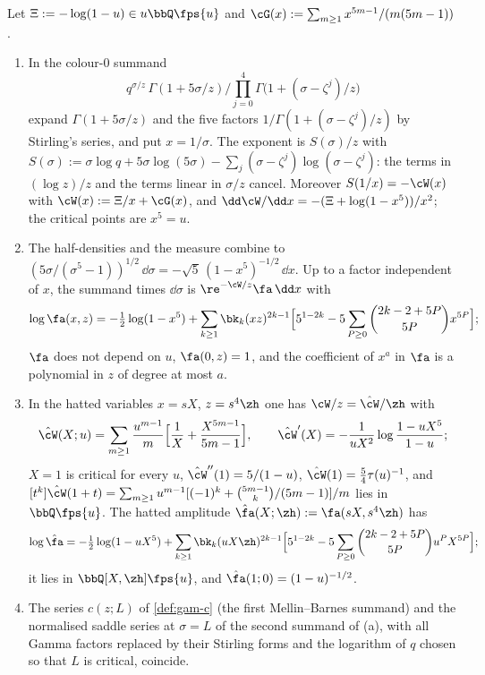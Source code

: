 \begin{lem}
\label{lem:con-form}
Let $\Xi:=-\log(1-u)\in u\bbQ\fps{u}$ and $\cG(x):=\sum_{m\geq1}x^{5m-1}/(m(5m-1))$.
\begin{enumerate}
\item[(a)] In the colour-$0$ summand
\[
q^{\sigma/z}\,\Gamma(1+5\sigma/z)\Big/\prod_{j=0}^4\Gamma\bigl(1+(\sigma-\zeta^j)/z\bigr)
\]
expand $\Gamma(1+5\sigma/z)$ and the five factors $1/\Gamma(1+(\sigma-\zeta^j)/z)$ by Stirling's series, and put $x=1/\sigma$. The exponent is $S(\sigma)/z$ with $S(\sigma):=\sigma\log q+5\sigma\log(5\sigma)-\sum_j(\sigma-\zeta^j)\log(\sigma-\zeta^j)$: the terms in $(\log z)/z$ and the terms linear in $\sigma/z$ cancel. Moreover $S(1/x)=-\cW(x)$ with $\cW(x):=\Xi/x+\cG(x)$, and $\dd\cW/\dd x=-(\Xi+\log(1-x^5))/x^2$; the critical points are $x^5=u$.
\item[(b)] The half-densities and the measure combine to $(5\sigma/(\sigma^5-1))^{1/2}\,\dd\sigma=-\sqrt5\,(1-x^5)^{-1/2}\,\dd x$. Up to a factor independent of $x$, the summand times $\dd\sigma$ is $\re^{-\cW/z}\fa\,\dd x$ with
\[
\log\fa(x,z)=-\tfrac12\log(1-x^5)+\sum_{k\geq1}\bk_k(xz)^{2k-1}\Bigl[5^{1-2k}-5\sum_{P\geq0}\binom{2k-2+5P}{5P}x^{5P}\Bigr];
\]
$\fa$ does not depend on $u$, $\fa(0,z)=1$, and the coefficient of $x^a$ in $\fa$ is a polynomial in $z$ of degree at most $a$.
\item[(c)] In the hatted variables $x=sX$, $z=s^4\zh$ one has $\cW/z=\hat\cW/\zh$ with
\[
\hat\cW(X;u)=\sum_{m\geq1}\frac{u^{m-1}}m\Bigl[\frac1X+\frac{X^{5m-1}}{5m-1}\Bigr],\qquad \hat\cW'(X)=-\frac1{uX^2}\log\frac{1-uX^5}{1-u};
\]
$X=1$ is critical for every $u$, $\hat\cW''(1)=5/(1-u)$, $\hat\cW(1)=\frac54\tau(u)^{-1}$, and $[t^k]\hat\cW(1+t)=\sum_{m\geq1}u^{m-1}[(-1)^k+\binom{5m-1}{k}/(5m-1)]/m$ lies in $\bbQ\fps{u}$. The hatted amplitude $\hat\fa(X;\zh):=\fa(sX,s^4\zh)$ has
\[
\log\hat\fa=-\tfrac12\log(1-uX^5)+\sum_{k\geq1}\bk_k(uX\zh)^{2k-1}\Bigl[5^{1-2k}-5\sum_{P\geq0}\binom{2k-2+5P}{5P}u^PX^{5P}\Bigr];
\]
it lies in $\bbQ[X,\zh]\fps{u}$, and $\hat\fa(1;0)=(1-u)^{-1/2}$.
\item[(d)] The series $c(z;L)$ of \cref{def:gam-c} (the first Mellin--Barnes summand) and the normalised saddle series at $\sigma=L$ of the second summand of (a), with all Gamma factors replaced by their Stirling forms and the logarithm of $q$ chosen so that $L$ is critical, coincide.
\end{enumerate}
\end{lem}


